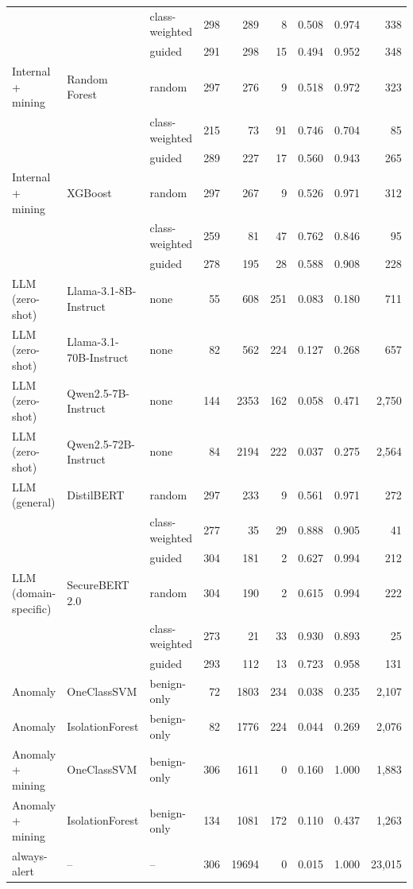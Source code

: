 \begin{table}[htbp]
{\begin{tabular}{lllrrrccr}
 &  & class-weighted & 298 & 289 & 8 & 0.508 & 0.974 & 338 \\
 &  & guided & 291 & 298 & 15 & 0.494 & 0.952 & 348 \\
\addlinespace
Internal + mining & Random Forest & random & 297 & 276 & 9 & 0.518 & 0.972 & 323 \\
 &  & class-weighted & 215 & 73 & 91 & 0.746 & 0.704 & 85 \\
 &  & guided & 289 & 227 & 17 & 0.560 & 0.943 & 265 \\
\addlinespace
Internal + mining & XGBoost & random & 297 & 267 & 9 & 0.526 & 0.971 & 312 \\
 &  & class-weighted & 259 & 81 & 47 & 0.762 & 0.846 & 95 \\
 &  & guided & 278 & 195 & 28 & 0.588 & 0.908 & 228 \\
\midrule
LLM (zero-shot) & Llama-3.1-8B-Instruct & none & 55 & 608 & 251 & 0.083 & 0.180 & 711 \\
\addlinespace
LLM (zero-shot) & Llama-3.1-70B-Instruct & none & 82 & 562 & 224 & 0.127 & 0.268 & 657 \\
\addlinespace
LLM (zero-shot) & Qwen2.5-7B-Instruct & none & 144 & 2353 & 162 & 0.058 & 0.471 & 2,750 \\
\addlinespace
LLM (zero-shot) & Qwen2.5-72B-Instruct & none & 84 & 2194 & 222 & 0.037 & 0.275 & 2,564 \\
\addlinespace
LLM (general) & DistilBERT & random & 297 & 233 & 9 & 0.561 & 0.971 & 272 \\
 &  & class-weighted & 277 & 35 & 29 & 0.888 & 0.905 & 41 \\
 &  & guided & 304 & 181 & 2 & 0.627 & 0.994 & 212 \\
\addlinespace
LLM (domain-specific) & SecureBERT 2.0 & random & 304 & 190 & 2 & 0.615 & 0.994 & 222 \\
 &  & class-weighted & 273 & 21 & 33 & 0.930 & 0.893 & 25 \\
 &  & guided & 293 & 112 & 13 & 0.723 & 0.958 & 131 \\
\midrule
Anomaly & OneClassSVM & benign-only & 72 & 1803 & 234 & 0.038 & 0.235 & 2,107 \\
\addlinespace
Anomaly & IsolationForest & benign-only & 82 & 1776 & 224 & 0.044 & 0.269 & 2,076 \\
\addlinespace
Anomaly + mining & OneClassSVM & benign-only & 306 & 1611 & 0 & 0.160 & 1.000 & 1,883 \\
\addlinespace
Anomaly + mining & IsolationForest & benign-only & 134 & 1081 & 172 & 0.110 & 0.437 & 1,263 \\
\midrule
always-alert & -- & -- & 306 & 19694 & 0 & 0.015 & 1.000 & 23,015 \\
\bottomrule
\end{tabular}%
}
\end{table}
